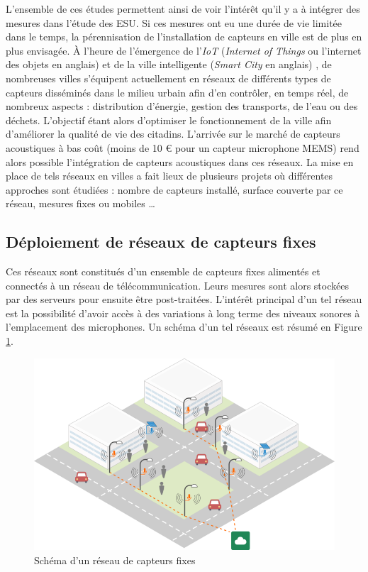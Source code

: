 L'ensemble de ces études permettent ainsi de voir l'intérêt qu'il y a à intégrer des mesures dans l'étude des ESU. Si ces mesures ont eu une durée de vie limitée dans le temps, la pérennisation de l'installation de capteurs en ville est de plus en plus envisagée. À l'heure de l'émergence de l'\textit{IoT} (\textit{Internet of Things} ou l'internet des objets en anglais) \cite{zanella2014internet} et de la ville intelligente (\textit{Smart City} en anglais) \cite{chourabi2012understanding}, de nombreuses villes s'équipent actuellement en réseaux de différents types de capteurs disséminés dans le milieu urbain afin d'en contrôler, en temps réel, de nombreux aspects : distribution d'énergie, gestion des transports, de l'eau ou des déchets. L'objectif étant alors d'optimiser le fonctionnement de la ville afin d'améliorer la qualité de vie des citadins. L'arrivée sur le marché de capteurs acoustiques à bas coût (moins de 10 € pour un capteur microphone MEMS) \cite{van2010use} rend alors possible l'intégration de capteurs acoustiques dans ces réseaux. La mise en place de tels réseaux en  villes a fait lieux de plusieurs projets où différentes approches sont étudiées : nombre de capteurs installé, surface couverte par ce réseau, mesures fixes ou mobiles \dots

\subsection{Déploiement de réseaux de capteurs fixes}

Ces réseaux sont constitués d'un ensemble de capteurs fixes alimentés et connectés à un réseau de télécommunication. Leurs mesures sont alors stockées par des serveurs pour ensuite être post-traitées. L'intérêt principal d'un tel réseau est la possibilité d'avoir accès à des variations à long terme des niveaux sonores à l'emplacement des microphones. Un schéma d'un tel réseaux est résumé en Figure \ref{fig:reseau_capteur}.

\begin{figure}[t]
\centering
\includegraphics[width=0.8\linewidth]{./figures/cartographie/reseau_mesure.png}
\caption[Schéma d'un réseau de capteurs fixes]{Schéma d'un réseau de capteurs fixes\protect\footnotemark}
\label{fig:reseau_capteur}
\end{figure}

